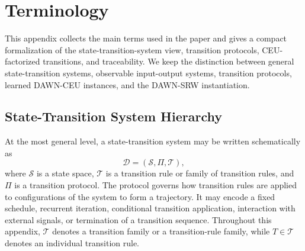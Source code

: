 \documentclass{article}
\begin{document}
\section{Terminology}
\label{app:terminology}

This appendix collects the main terms used in the paper and gives a compact formalization of the state-transition-system view, transition protocols, CEU-factorized transitions, and traceability. We keep the distinction between general state-transition systems, observable input-output systems, transition protocols, learned DAWN-CEU instances, and the DAWN-SRW instantiation.

\subsection{State-Transition System Hierarchy}

At the most general level, a state-transition system may be written schematically as
\begin{equation}
    \mathcal{D}=(\mathcal{S},\Pi,\mathcal{T}),
    \label{eq:app_state_transition_system}
\end{equation}
where $\mathcal{S}$ is a state space, $\mathcal{T}$ is a transition rule or family of transition rules, and $\Pi$ is a transition protocol. The protocol governs how transition rules are applied to configurations of the system to form a trajectory. It may encode a fixed schedule, recurrent iteration, conditional transition application, interaction with external signals, or termination of a transition sequence. Throughout this appendix, $\mathcal{T}$ denotes a transition family or a transition-rule family, while $T\in\mathcal{T}$ denotes an individual transition rule.
\end{document}
